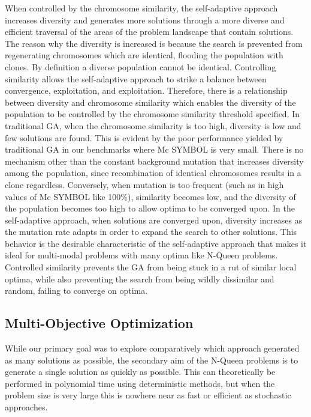 \documentclass[conference]{IEEEtran}
\begin{document}
When controlled by the chromosome similarity, the self-adaptive approach increases diversity and generates more solutions through a more diverse and efficient traversal of the areas of the problem landscape that contain solutions. The reason why the diversity is increased is because the search is prevented from regenerating chromosomes which are identical, flooding the population with clones. By definition a diverse population cannot be identical. Controlling similarity allows the self-adaptive approach to strike a balance between convergence, exploitation, and exploitation. Therefore, there is a relationship between diversity and chromosome similarity which enables the diversity of the population to be controlled by the chromosome similarity threshold specified. In traditional GA, when the chromosome similarity is too high, diversity is low and few solutions are found. This is evident by the poor performance yielded by traditional GA in our benchmarks where {Mc SYMBOL} is very small. There is no mechanism other than the constant background mutation that increases diversity among the population, since recombination of identical chromosomes results in a clone regardless. Conversely, when mutation is too frequent (such as in high values of {Mc SYMBOL} like 100\%), similarity becomes low, and the diversity of the population becomes too high to allow optima to be converged upon. In the self-adaptive approach, when solutions are converged upon, diversity increases as the mutation rate adapts in order to expand the search to other solutions. This behavior is the desirable characteristic of the self-adaptive approach that makes it ideal for multi-modal problems with many optima like N-Queen problems. Controlled similarity prevents the GA from being stuck in a rut of similar local optima, while also preventing the search from being wildly dissimilar and random, failing to converge on optima.

\subsection{Multi-Objective Optimization}
While our primary goal was to explore comparatively which approach generated as many solutions as possible, the secondary aim of the N-Queen problems is to generate a single solution as quickly as possible. This can theoretically be performed in polynomial time using deterministic methods, but when the problem size is very large this is nowhere near as fast or efficient as stochastic approaches.
\end{document}
